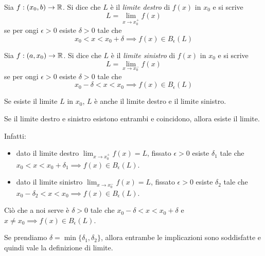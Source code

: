 \begin{definition}
Sia $f: (x_0, b) \to \mathbb R$. Si dice che $L$ è il \emph{limite destro} di $f(x)$ in $x_0$ e si scrive
\begin{equation*}
L = \lim_{x \to x_0^+} f(x)
\end{equation*}
se per ongi $\epsilon > 0$ esiste $\delta > 0$ tale che
\begin{equation*}
x_0 < x < x_0 + \delta \implies f(x) \in B_\epsilon (L)
\end{equation*}
\end{definition}

\begin{definition}
Sia $f: (a, x_0) \to \mathbb R$. Si dice che $L$ è il \emph{limite sinistro} di $f(x)$ in $x_0$ e si scrive
\begin{equation*}
L = \lim_{x \to x_0^-} f(x)
\end{equation*}
se per ongi $\epsilon > 0$ esiste $\delta > 0$ tale che
\begin{equation*}
x_0 - \delta < x < x_0 \implies f(x) \in B_\epsilon (L)
\end{equation*}
\end{definition}

\begin{remark}
Se esiste il limite $L$ in $x_0$, $L$ è anche il limite destro e il limite sinistro.
\end{remark}
\begin{remark}
Se il limite destro e sinistro esistono entrambi e coincidono, allora esiste il limite.
\end{remark}

Infatti:
\begin{itemize}
\item dato il limite destro $\lim_{x \to x_0^+} f(x) = L$, fissato $\epsilon > 0$ esiste $\delta_1$ tale che $x_0 < x < x_0 + \delta_1 \implies f(x) \in B_\epsilon (L)$.
\item dato il limite sinistro $\lim_{x \to x_0^-} f(x) = L$, fissato $\epsilon > 0$ esiste $\delta_2$ tale che $x_0 - \delta_2 < x < x_0 \implies f(x) \in B_\epsilon (L)$.
\end{itemize}

Ciò che a noi serve è $\delta > 0$ tale che $x_0 - \delta < x < x_0 + \delta$ e $x \neq x_0 \implies f(x) \in B_\epsilon (L)$.

Se prendiamo $\delta = \min\{\delta_1, \delta_2\}$, allora entrambe le implicazioni sono soddisfatte e quindi vale la definizione di limite.

